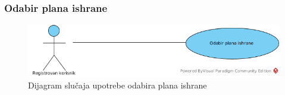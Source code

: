 \subsubsection{Odabir plana ishrane}

\begin{figure}[H]
\begin{center}
\includegraphics[width=\textwidth]{Pictures/uc_select_meal_plan.png}
\end{center}
    \caption{Dijagram slučaja upotrebe odabira plana ishrane}
\label{fig:UCSelectMealPlan}
\end{figure}

